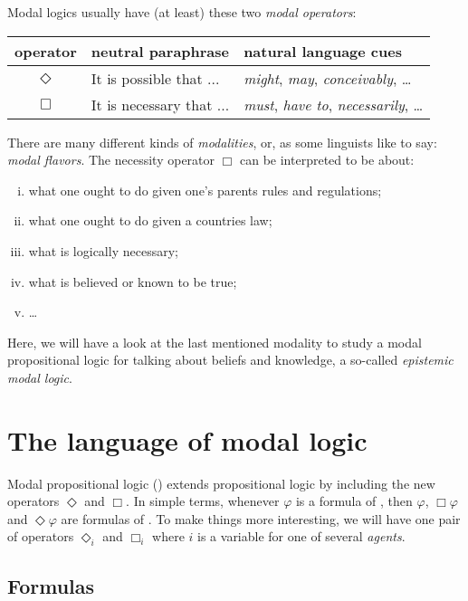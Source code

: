 \documentclass[nobib,nofonts]{tufte-handout}
\newcommand{\proplog}{\acro{PropLog}}
\newcommand{\modlog}{\acro{ModLog}}
\begin{document}
Modal logics usually have (at least) these two \emph{modal operators}:
\begin{center}
  \begin{tabular}{cll}
    operator   & neutral paraphrase & natural language cues \\ \hline
    $\Diamond$ & It is possible that ... & \emph{might}, \emph{may}, \emph{conceivably}, \dots \\
    $\Box$     & It is necessary that ... & \emph{must}, \emph{have to}, \emph{necessarily}, \dots \\
  \end{tabular}
\end{center}
There are many different kinds of \emph{modalities}, or, as some linguists like to say: \emph{modal flavors}.
The necessity operator $\Box$ can be interpreted to be about:
\begin{enumerate}[(i)]
  \item what one ought to do given one's parents rules and regulations;
  \item what one ought to do given a countries law;
  \item what is logically necessary;
  \item what is believed or known to be true;
  \item \dots
\end{enumerate}
Here, we will have a look at the last mentioned modality to study a modal propositional logic for talking about beliefs and knowledge, a so-called \emph{epistemic modal logic}.


\section{The language of modal logic}

Modal propositional logic (\modlog) extends propositional logic by including the new operators $\Diamond$ and $\Box$.
In simple terms, whenever $\varphi$ is a formula of \proplog, then $\varphi$, $\Box \varphi$ and $\Diamond \varphi$ are formulas of \modlog.
To make things more interesting, we will have one pair of operators $\Diamond_{i}$ and $\Box_{i}$ where $i$ is a variable for one of several \emph{agents}.

\subsection{Formulas}
\end{document}
